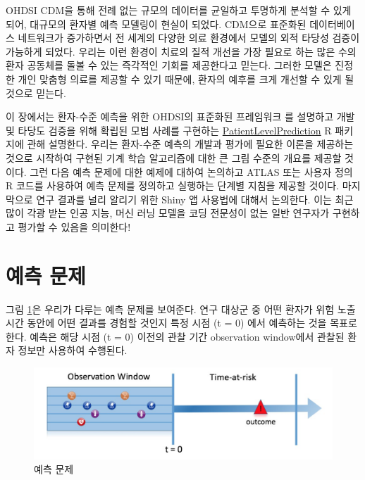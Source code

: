 \documentclass[10.5pt]{book}
\theoremstyle{definition}
\theoremstyle{definition}
\theoremstyle{definition}
\theoremstyle{remark}
\begin{document}
OHDSI CDM을 통해 전례 없는 규모의 데이터를 균일하고 투명하게 분석할 수
있게 되어, 대규모의 환자별 예측 모델링이 현실이 되었다. CDM으로 표준화된
데이터베이스 네트워크가 증가하면서 전 세계의 다양한 의료 환경에서 모델의
외적 타당성 검증이 가능하게 되었다. 우리는 이런 환경이 치료의 질적
개선을 가장 필요로 하는 많은 수의 환자 공동체를 돌볼 수 있는 즉각적인
기회를 제공한다고 믿는다. 그러한 모델은 진정한 개인 맞춤형 의료를 제공할
수 있기 때문에, 환자의 예후를 크게 개선할 수 있게 될 것으로 믿는다.

이 장에서는 환자-수준 예측을 위한 OHDSI의 표준화된 프레임워크
\citep{reps2018} 를 설명하고 개발 및 타당도 검증을 위해 확립된 모범
사례를 구현하는
\href{https://ohdsi.github.io/PatientLevelPrediction/}{PatientLevelPrediction}
R 패키지에 관해 설명한다. 우리는 환자-수준 예측의 개발과 평가에 필요한
이론을 제공하는 것으로 시작하여 구현된 기계 학습 알고리즘에 대한 큰 그림
수준의 개요를 제공할 것이다. 그런 다음 예측 문제에 대한 예제에 대하여
논의하고 ATLAS 또는 사용자 정의 R 코드를 사용하여 예측 문제를 정의하고
실행하는 단계별 지침을 제공할 것이다. 마지막으로 연구 결과를 널리 알리기
위한 Shiny 앱 사용법에 대해서 논의한다. 이는 최근 많이 각광 받는 인공
지능, 머신 러닝 모델을 코딩 전문성이 없는 일반 연구자가 구현하고 평가할
수 있음을 의미한다!

\section{예측 문제}\label{-}

그림 \ref{fig:figure1}은 우리가 다루는 예측 문제를 보여준다. 연구 대상군
중 어떤 환자가 위험 노출 시간 동안에 어떤 결과를 경험할 것인지 특정 시점
(t = 0) 에서 예측하는 것을 목표로 한다. 예측은 해당 시점 (t = 0) 이전의
관찰 기간 observation window에서 관찰된 환자 정보만 사용하여 수행된다.

\begin{figure}

{\centering \includegraphics[width=1\linewidth]{images/PatientLevelPrediction/Figure1} 

}

\caption{예측 문제}\label{fig:figure1}
\end{figure}
\end{document}
